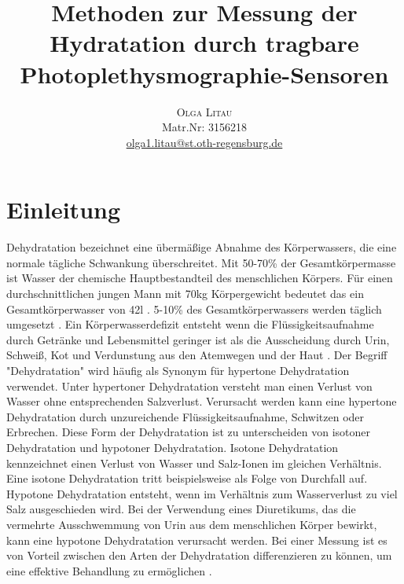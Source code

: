 \documentclass[10pt,a4paper,headinclude,twoside, plainheadsepline, open=right, numbers=noenddot, twocolumn]{article}
\title{\vspace{-5mm}%
	\fontsize{20pt}{10pt}\selectfont
	\textbf{Methoden zur Messung der Hydratation durch tragbare Photoplethysmographie-Sensoren}
	}
\author{
	\large
       \begin{minipage}[t]{0.33\linewidth}
         \begin{center}
           	\textsc{Olga Litau}\\[2mm]
                 \normalsize	Matr.Nr: 3156218\\
                 \normalsize
                 \href{mailto:olga1.litau@st.oth-regensburg.de}
                 {olga1.litau@st.oth-regensburg.de}      
         \end{center}
       \end{minipage}        
     }
\begin{document}


\section{Einleitung}
\label{einleitung}
Dehydratation bezeichnet eine übermäßige Abnahme des Körperwassers, die eine normale tägliche Schwankung überschreitet. 
Mit 50-70\% der Gesamtkörpermasse ist Wasser der chemische Hauptbestandteil des menschlichen Körpers.
Für einen durchschnittlichen jungen Mann mit 70kg Körpergewicht bedeutet das ein Gesamtkörperwasser von 42l \cite{sawka2015hypohydration}.
5-10\% des Gesamtkörperwassers werden täglich umgesetzt \cite{raman2004american}.
Ein Körperwasserdefizit entsteht wenn die Flüssigkeitsaufnahme durch Getränke und Lebensmittel geringer ist als die Ausscheidung durch Urin, Schweiß, Kot und Verdunstung aus den Atemwegen und der Haut \cite{garret2018engineering}.
Der Begriff "Dehydratation" wird häufig als Synonym für hypertone Dehydratation verwendet.
Unter hypertoner Dehydratation versteht man einen Verlust von Wasser ohne entsprechenden Salzverlust. 
Verursacht werden kann eine hypertone Dehydratation durch unzureichende Flüssigkeitsaufnahme, Schwitzen oder Erbrechen.
Diese Form der Dehydratation ist zu unterscheiden von isotoner Dehydratation und hypotoner Dehydratation.
Isotone Dehydratation kennzeichnet einen Verlust von Wasser und Salz-Ionen im gleichen Verhältnis.
Eine isotone Dehydratation tritt beispielsweise als Folge von Durchfall auf.
Hypotone Dehydratation entsteht, wenn im Verhältnis zum Wasserverlust zu viel Salz ausgeschieden wird.
Bei der Verwendung eines Diuretikums, das die vermehrte Ausschwemmung von Urin aus dem menschlichen Körper bewirkt, kann eine hypotone Dehydratation verursacht werden. 
Bei einer Messung ist es von Vorteil zwischen den Arten der Dehydratation differenzieren zu können, um eine effektive Behandlung zu ermöglichen \cite{garret2018engineering}.
\end{document}

